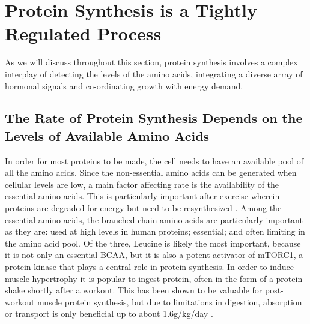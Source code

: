 \documentclass{tufte-handout}
\begin{document}
\section{Protein Synthesis is a Tightly Regulated Process}

As we will discuss throughout this section, protein synthesis involves a complex interplay of detecting the levels of the amino acids, integrating a diverse array of hormonal signals and co-ordinating growth with energy demand.

\subsection{The Rate of Protein Synthesis Depends on the Levels of Available Amino Acids}

In order for most proteins to be made, the cell needs to have an available pool of all the amino acids.  Since the non-essential amino acids can be generated when cellular levels are low, a main factor affecting rate is the availability of the essential amino acids.  This is particularly important after exercise wherein proteins are degraded for energy but need to be resynthesized \citep{Tipton1999}.  Among the essential amino acids, the branched-chain amino acids are particularly important as they are: used at high levels in human proteins; essential; and often limiting in the amino acid pool.  Of the three, Leucine is likely the most important, because it is not only an essential BCAA, but it is also a potent activator of mTORC1, a protein kinase that plays a central role in protein synthesis.   In order to induce muscle hypertrophy it is popular to ingest protein, often in the form of a protein shake shortly after a workout.  This has been shown to be valuable for post-workout muscle protein synthesis, but due to limitations in digestion, absorption or transport is only beneficial up to about 1.6g/kg/day \citep{Morton2017}.
\end{document}
